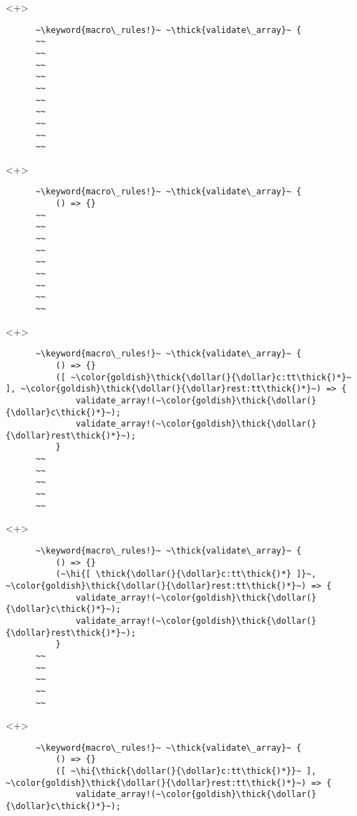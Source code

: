 \documentclass[usepdftitle=false,aspectratio=169]{beamer}
\newcommand{\dollar}{\makebox[\widthof{\$}][c]{\$}}
\newcommand{\thick}[1]{\contourlength{0.16pt}\contour[10]{black}{#1}}
\newcommand{\hi}[1]{%
\tikz[baseline=(A.base)]
 \node[highlighting=yellowbg,inner sep=0pt,text depth=0pt] (A) {#1};%
}
\newcommand{\keyword}[1]{\color{greenish}#1}
\begin{document}
\begin{frame}[fragile]
  \begin{onlyenv}<+>
    \begin{verbatim}
      ~\keyword{macro\_rules!}~ ~\thick{validate\_array}~ {
      ~~
      ~~
      ~~
      ~~
      ~~
      ~~
      ~~
      ~~
      ~~
      ~~
    \end{verbatim}
  \end{onlyenv}
  \begin{onlyenv}<+>
    \begin{verbatim}
      ~\keyword{macro\_rules!}~ ~\thick{validate\_array}~ {
          () => {}
      ~~
      ~~
      ~~
      ~~
      ~~
      ~~
      ~~
      ~~
      ~~
    \end{verbatim}
  \end{onlyenv}
  \begin{onlyenv}<+>
    \begin{verbatim}
      ~\keyword{macro\_rules!}~ ~\thick{validate\_array}~ {
          () => {}
          ([ ~\color{goldish}\thick{\dollar(}{\dollar}c:tt\thick{)*}~ ], ~\color{goldish}\thick{\dollar(}{\dollar}rest:tt\thick{)*}~) => {
              validate_array!(~\color{goldish}\thick{\dollar(}{\dollar}c\thick{)*}~);
              validate_array!(~\color{goldish}\thick{\dollar(}{\dollar}rest\thick{)*}~);
          }
      ~~
      ~~
      ~~
      ~~
      ~~
    \end{verbatim}
  \end{onlyenv}
  \begin{onlyenv}<+>
    \begin{verbatim}
      ~\keyword{macro\_rules!}~ ~\thick{validate\_array}~ {
          () => {}
          (~\hi{[ \thick{\dollar(}{\dollar}c:tt\thick{)*} ]}~, ~\color{goldish}\thick{\dollar(}{\dollar}rest:tt\thick{)*}~) => {
              validate_array!(~\color{goldish}\thick{\dollar(}{\dollar}c\thick{)*}~);
              validate_array!(~\color{goldish}\thick{\dollar(}{\dollar}rest\thick{)*}~);
          }
      ~~
      ~~
      ~~
      ~~
      ~~
    \end{verbatim}
  \end{onlyenv}
  \begin{onlyenv}<+>
    \begin{verbatim}
      ~\keyword{macro\_rules!}~ ~\thick{validate\_array}~ {
          () => {}
          ([ ~\hi{\thick{\dollar(}{\dollar}c:tt\thick{)*}}~ ], ~\color{goldish}\thick{\dollar(}{\dollar}rest:tt\thick{)*}~) => {
              validate_array!(~\color{goldish}\thick{\dollar(}{\dollar}c\thick{)*}~);

\end{verbatim}
\end{onlyenv}
\end{frame}
\end{document}
